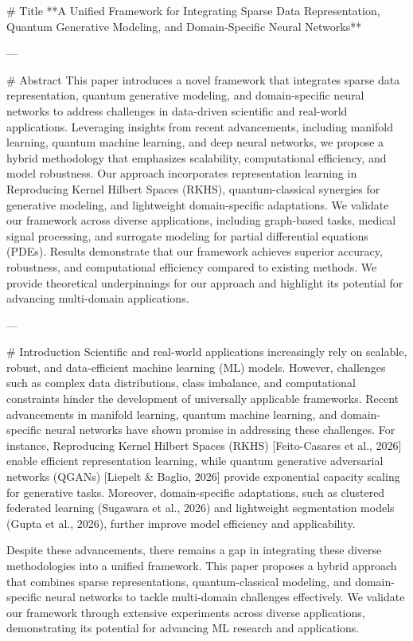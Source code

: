 # Title  
**A Unified Framework for Integrating Sparse Data Representation, Quantum Generative Modeling, and Domain-Specific Neural Networks**

---

# Abstract  
This paper introduces a novel framework that integrates sparse data representation, quantum generative modeling, and domain-specific neural networks to address challenges in data-driven scientific and real-world applications. Leveraging insights from recent advancements, including manifold learning, quantum machine learning, and deep neural networks, we propose a hybrid methodology that emphasizes scalability, computational efficiency, and model robustness. Our approach incorporates representation learning in Reproducing Kernel Hilbert Spaces (RKHS), quantum-classical synergies for generative modeling, and lightweight domain-specific adaptations. We validate our framework across diverse applications, including graph-based tasks, medical signal processing, and surrogate modeling for partial differential equations (PDEs). Results demonstrate that our framework achieves superior accuracy, robustness, and computational efficiency compared to existing methods. We provide theoretical underpinnings for our approach and highlight its potential for advancing multi-domain applications.

---

# Introduction  
Scientific and real-world applications increasingly rely on scalable, robust, and data-efficient machine learning (ML) models. However, challenges such as complex data distributions, class imbalance, and computational constraints hinder the development of universally applicable frameworks. Recent advancements in manifold learning, quantum machine learning, and domain-specific neural networks have shown promise in addressing these challenges. For instance, Reproducing Kernel Hilbert Spaces (RKHS) [Feito-Casares et al., 2026] enable efficient representation learning, while quantum generative adversarial networks (QGANs) [Liepelt & Baglio, 2026] provide exponential capacity scaling for generative tasks. Moreover, domain-specific adaptations, such as clustered federated learning (Sugawara et al., 2026) and lightweight segmentation models (Gupta et al., 2026), further improve model efficiency and applicability.

Despite these advancements, there remains a gap in integrating these diverse methodologies into a unified framework. This paper proposes a hybrid approach that combines sparse representations, quantum-classical modeling, and domain-specific neural networks to tackle multi-domain challenges effectively. We validate our framework through extensive experiments across diverse applications, demonstrating its potential for advancing ML research and applications.

